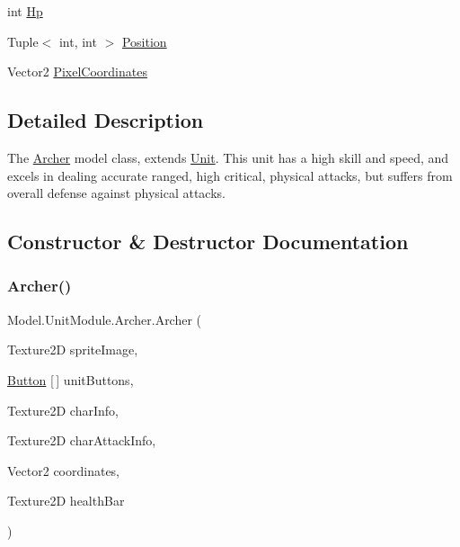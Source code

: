 \begin{DoxyCompactItemize}
\item 
int \hyperlink{class_model_1_1_unit_module_1_1_archer_aa98508c9166b0d5661952efc2577e2f7}{Hp}
\item 
Tuple$<$ int, int $>$ \hyperlink{class_model_1_1_unit_module_1_1_archer_a0038f1b30e38e431dee388f6fdf8b6d7}{Position}
\item 
Vector2 \hyperlink{class_model_1_1_unit_module_1_1_archer_abe69c6c957abd5c25c7c52576faa015c}{Pixel\+Coordinates}
\end{DoxyCompactItemize}


\subsection{Detailed Description}
The \hyperlink{class_model_1_1_unit_module_1_1_archer}{Archer} model class, extends \hyperlink{interface_model_1_1_unit_module_1_1_unit}{Unit}. This unit has a high skill and speed, and excels in dealing accurate ranged, high critical, physical attacks, but suffers from overall defense against physical attacks. 



\subsection{Constructor \& Destructor Documentation}
\hypertarget{class_model_1_1_unit_module_1_1_archer_acb9f7b98dd16e29be30ee2fd97ce0cbc}{}\label{class_model_1_1_unit_module_1_1_archer_acb9f7b98dd16e29be30ee2fd97ce0cbc} 
\subsubsection{\texorpdfstring{Archer()}{Archer()}}
{\footnotesize\ttfamily Model.\+Unit\+Module.\+Archer.\+Archer (\begin{DoxyParamCaption}\item[{Texture2D}]{sprite\+Image,  }\item[{\hyperlink{class_model_1_1_button}{Button} \mbox{[}$\,$\mbox{]}}]{unit\+Buttons,  }\item[{Texture2D}]{char\+Info,  }\item[{Texture2D}]{char\+Attack\+Info,  }\item[{Vector2}]{coordinates,  }\item[{Texture2D}]{health\+Bar }\end{DoxyParamCaption})\hspace{0.3cm}{\ttfamily [inline]}}

